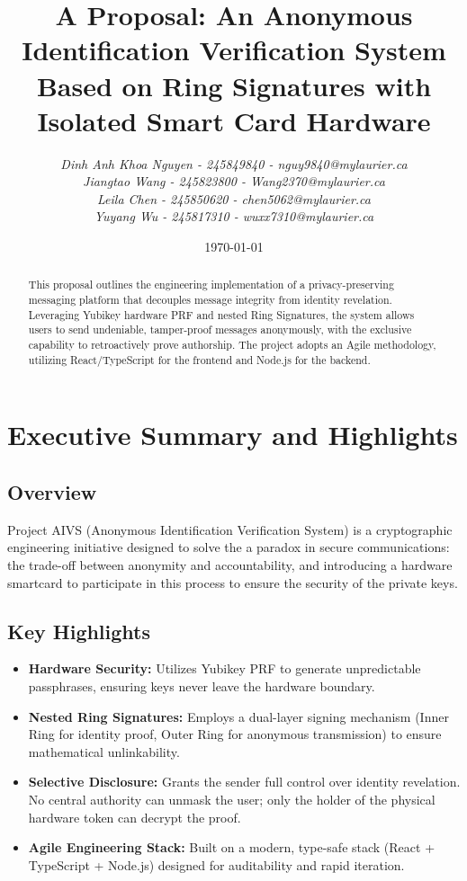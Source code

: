 \documentclass[letterpaper,11pt]{article}
\title{\textbf{A Proposal: An Anonymous Identification Verification System}\\Based on Ring Signatures with Isolated Smart Card Hardware}
\author{
\textit{Dinh Anh Khoa Nguyen - 245849840 - nguy9840@mylaurier.ca}\\
\textit{Jiangtao Wang - 245823800 - Wang2370@mylaurier.ca}\\
\textit{Leila Chen - 245850620 - chen5062@mylaurier.ca}\\
\textit{Yuyang Wu - 245817310 - wuxx7310@mylaurier.ca}\\
}
\date{\today}
\begin{document}
\maketitle
\thispagestyle{empty}

\begin{abstract}
This proposal outlines the engineering implementation of a privacy-preserving messaging platform that decouples message integrity from identity revelation. Leveraging Yubikey hardware PRF and nested Ring Signatures, the system allows users to send undeniable, tamper-proof messages anonymously, with the exclusive capability to retroactively prove authorship. The project adopts an Agile methodology, utilizing React/TypeScript for the frontend and Node.js for the backend.
\end{abstract}
\newpage

\tableofcontents
\newpage

\section{Executive Summary and Highlights}

\subsection{Overview}
Project AIVS (Anonymous Identification Verification System) is a cryptographic engineering initiative designed to solve the a paradox in secure communications: the trade-off between anonymity and accountability, and introducing a hardware smartcard to participate in this process to ensure the security of the private keys.
\subsection{Key Highlights}
\begin{itemize}
    \item \textbf{Hardware Security:} Utilizes Yubikey PRF to generate unpredictable passphrases, ensuring keys never leave the hardware boundary.
    \item \textbf{Nested Ring Signatures:} Employs a dual-layer signing mechanism (Inner Ring for identity proof, Outer Ring for anonymous transmission) to ensure mathematical unlinkability.
    \item \textbf{Selective Disclosure:} Grants the sender full control over identity revelation. No central authority can unmask the user; only the holder of the physical hardware token can decrypt the proof.
    \item \textbf{Agile Engineering Stack:} Built on a modern, type-safe stack (React + TypeScript + Node.js) designed for auditability and rapid iteration.
\end{itemize}
\end{document}
